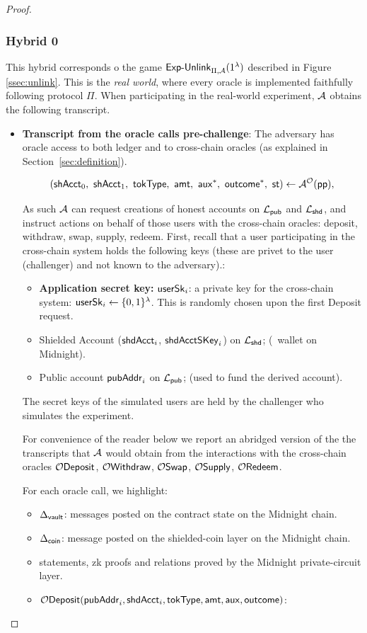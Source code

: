 \begin{proof}
\subsubsection{Hybrid 0}
This hybrid corresponds o the game $\mathsf{Exp\text{-}Unlink}_{\Pi,\mathcal{A}}(1^{\lambda})$ described in Figure \ref{ssec:unlink}. This is the \emph{real world}, where every oracle is implemented faithfully following protocol $\Pi$.
When participating in the real-world  experiment, $\mathcal{A}$  obtains the following transcript.


\begin{itemize} [label=$\blacksquare$]
    \item\textbf{Transcript from the oracle calls  pre-challenge}:
    The adversary has oracle access to both ledger and to cross-chain oracles  (as explained in Section~\ref{sec:definition}).

          \[(\candZero\bc \candOne\bc \tokType\bc \amt\bc \auxx^*\bc \outc^*\bc
      \mathsf{st}) \gets \Adv^{\mathcal{O}}(\pp),\]


    As such $\mathcal{A}$ can request creations of honest accounts on $\mathcal{L}_{\mathsf{pub}}$ and $\mathcal{L}_{\mathsf{shd}}$, and
    instruct actions on behalf of those users with the cross-chain oracles: deposit, withdraw, swap, supply, redeem.
     First,  recall that a user participating in the cross-chain system holds the following keys (these are privet to the user (challenger) and not known to the adversary).:
\begin{itemize}
    \item { \bf Application secret key:} $\mathsf{userSk}_i$: a private key for the cross-chain system: $\mathsf{userSk}_i\leftarrow\{0,1\}^{\lambda}$. This is randomly chosen upon the first Deposit request.
    \item Shielded Account  ($\mathsf{shdAcct}_i$, $\mathsf{shdAcctSKey}_i$) on $\mathcal{L}_{\mathsf{shd}}$; (\zkswap\ wallet on Midnight).
    \item Public account $\mathsf{pubAddr}_i$  on $\mathcal{L}_{\mathsf{pub}}$; (used to fund the derived account).
\end{itemize}
The secret keys of the simulated users are held by the challenger who simulates the experiment.


\medskip

For convenience of the reader below we report an abridged version of the the transcripts that $\mathcal{A}$ would obtain from the interactions with the cross-chain oracles $\mathcal{O}\mathsf{Deposit}$, $\mathcal{O}\mathsf{Withdraw}$, $\mathcal{O}\mathsf{Swap}$, $\mathcal{O}\mathsf{Supply}$, $\mathcal{O}\mathsf{Redeem}$.

For each oracle call, we highlight:
\begin{itemize}
    \item $\Delta_{\mathsf{vault}}$: messages posted on the contract state  on the Midnight chain.
    \item $\Delta_{\mathsf{coin}}$: message posted on the shielded-coin layer on the Midnight chain.
    \item statements, zk proofs and relations proved by the Midnight private-circuit layer.
\end{itemize}
\begin{itemize}
    \item $\mathcal{O}\mathsf{Deposit}(\mathsf{pubAddr}_i, \mathsf{shdAcct}_i, \mathsf{tokType}, \mathsf{amt}, \mathsf{aux}, \mathsf{outcome})$:



\end{itemize}
\end{itemize}
\end{proof}
